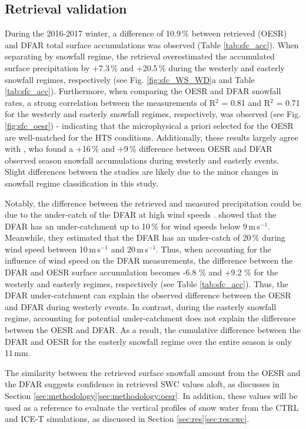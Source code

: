 \documentclass{ametsocV5}
\begin{document}
	\subsection{Retrieval validation}
		During the 2016-2017 winter, a difference of 10.9\,\% between retrieved (OESR) and DFAR total surface accumulations was observed (Table \ref{tab:sfc_acc}). When separating by snowfall regime, the retrieval overestimated the accumulated surface precipitation by +7.3\,\% and +20.5\,\% during the westerly and easterly snowfall regimes, respectively (see Fig. \ref{fig:sfc_WS_WD}a and Table \ref{tab:sfc_acc}). Furthermore, when comparing the OESR and DFAR snowfall rates,  a strong correlation between the measurements of R$^2$ = 0.81 and R$^2$ = 0.71 for the westerly and easterly snowfall regimes, respectively, was observed (see Fig. \ref{fig:sfc_oesr}) - indicating that the microphysical a priori selected for the OESR are well-matched for the HTS conditions. Additionally, these results largely agree with \citet{schirle_estimation_2019}, who found a +16\,\% and +9\,\% difference between OESR and DFAR observed season snowfall accumulations during westerly and easterly events. Slight differences between the studies are likely due to the minor changes in snowfall regime classification in this study.

		Notably, the difference between the retrieved and measured precipitation could be due to the under-catch of the DFAR at high wind speeds \citep{theriault_impact_2015,nitu_iom_2018,colli_adjustments_2020}. \citet{nitu_iom_2018} showed that the DFAR has an under-catchment up to 10\,\% for wind speeds below 9\,m\,s$^{-1}$. Meanwhile, they estimated that the DFAR has an under-catch of 20\,\% during wind speed between 10\,m\,s$^{-1}$ and 20\,m\,s$^{-1}$. Thus, when accounting for the influence of wind speed on the DFAR measurements, the difference between the DFAR and OESR surface accumulation becomes -6.8 \% and +9.2 \% for the westerly and easterly regimes, respectively (see Table \ref{tab:sfc_acc}). Thus, the DFAR under-catchment can explain the observed difference between the OESR and DFAR during westerly events. In contrast, during the easterly snowfall regime, accounting for potential under-catchment does not explain the difference between the OESR and DFAR. As a result, the cumulative difference between the DFAR and OESR for the easterly snowfall regime over the entire season is only 11\,mm. 

		The similarity between the retrieved surface snowfall amount from the OESR and the DFAR suggests confidence in retrieved SWC values aloft, as discusses in Section \ref{sec:methodology}\ref{sec:methodology:oesr}. In addition, these values will be used as a reference to evaluate the vertical profiles of snow water from the CTRL and ICE-T simulations, as discussed in Section \ref{sec:res}\ref{sec:res:swc}.
	
\end{document}
